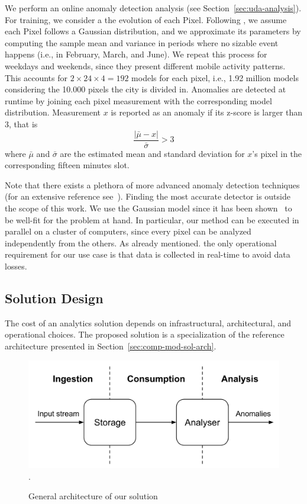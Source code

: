 {We perform an online anomaly detection analysis (see Section~\ref{sec:uda-analysis}). 
For training, we consider a the evolution of each \textsf{Pixel}. 
Following \cite{DBLP:journals/ieeemm/BalduiniVALAC15}, we assume each \textsf{Pixel} follows a Gaussian distribution, and we approximate its parameters by computing the sample mean and variance in periods where no sizable event happens (i.e., in February, March, and June). We repeat this process for weekdays and weekends, since they present different mobile activity patterns. This accounts for $2 \times 24 \times 4 = 192$ models for each pixel, i.e., 1.92 million models considering the 10.000 pixels the city is divided in. Anomalies are detected at runtime by joining each pixel measurement with the corresponding model distribution. Measurement $x$ is reported as an anomaly if its z-score is larger than $3$, that is 
\begin{equation}
\label{eq:zscore}
  \frac{|\bar{\mu} - x|}{\bar{\sigma}} > 3
\end{equation}
where $\bar{\mu}$ and $\bar{\sigma}$ are the estimated mean and standard deviation for $x$'s pixel in the corresponding fifteen minutes slot.

Note that there exists a plethora of more advanced anomaly detection techniques (for an extensive reference see~\cite{aggarwal2015outlier}). Finding the most accurate detector is outside the scope of this work. We use the Gaussian model since it has been shown~\cite{DBLP:journals/ieeemm/BalduiniVALAC15} to be well-fit for the problem at hand. In particular, our method can be executed in parallel on a cluster of computers, since every pixel can be analyzed independently from the others. As already mentioned. the only operational requirement for our use case is that data is collected in real-time to avoid data losses.

\subsection{Solution Design} \label{sec:solutions}
The cost of an analytics solution depends on infrastructural, architectural, and operational choices. The proposed solution is a specialization of the reference architecture presented in Section~\ref{sec:comp-mod-sol-arch}.

\begin{figure}[ht]
  \centering
  \includegraphics[width=.7\textwidth]{img/eval-arch-1}.
    \caption{General architecture of our solution}
    \label{fig:arch_abs}
\end{figure}

}
